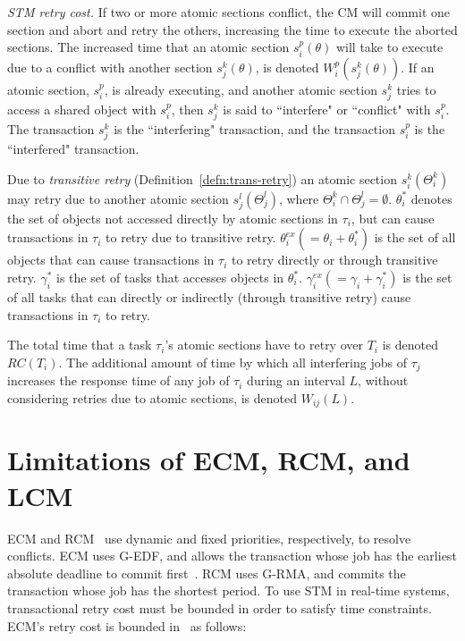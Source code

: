 \documentclass[twocolumn]{article}
\begin{document}
\textit{STM retry cost.} If two or more atomic sections conflict, the CM will commit one section and abort and retry the others, increasing the time to execute the aborted sections. The increased time that an atomic section $s_i^p (\theta)$ will take to execute due to a conflict with another section $s_j^k (\theta)$, is denoted $W_{i}^{p}(s_{j}^{k}(\theta))$. If an atomic section, $s_i^p$, is already executing, and another atomic section $s_j^k$ tries to access a shared object with $s_i^p$, then $s_j^k$ is said to ``interfere" or ``conflict" with $s_i^p$. The transaction $s_j^k$ is the ``interfering" transaction, and the transaction $s_i^p$ is the ``interfered" transaction.

Due to \textit{transitive retry} 
(Definition~\ref{defn:trans-retry}) 
an atomic section $s_i^k(\Theta_i^k)$ may retry due to another atomic section $s_j^l(\Theta_j^l)$, where $\Theta_i^k \cap \Theta_j^l = \emptyset$. $\theta_i^*$ denotes the set of objects not accessed directly by atomic sections in $\tau_i$, but can cause transactions in $\tau_i$ to retry due to transitive retry. $\theta_i^{ex}(=\theta_i + \theta_i^*)$ is the set of all objects that can cause transactions in $\tau_i$ to retry directly or through transitive retry. $\gamma_i^*$ is the set of tasks that accesses  objects in $\theta_i^*$. $\gamma_i^{ex}(=\gamma_i + \gamma_i^*)$ is the set of all tasks that can directly or indirectly (through transitive retry) cause transactions in $\tau_i$ to retry.

The total time that a task $\tau_i$'s atomic sections have to retry over $T_i$ is denoted $RC(T_i)$. The additional amount of time by which all interfering jobs of $\tau_j$ increases the response time of any job of $\tau_i$ during an interval $L$, without considering retries due to atomic sections, is denoted $W_{ij}(L)$.


\section{Limitations of ECM, RCM, and LCM}\label{probelm description}

ECM and RCM~\cite{stmconcurrencycontrol:emsoft11} use dynamic and fixed priorities, respectively, to resolve conflicts. ECM uses G-EDF, and allows the transaction whose job has the earliest absolute deadline to commit first~\cite{6045438}. RCM uses G-RMA, and commits the transaction whose job has the shortest period.
 To use STM in real-time systems, transactional retry cost must be bounded in order to satisfy time constraints.
  ECM's retry cost is bounded in~\cite{stmconcurrencycontrol:emsoft11} as follows:
\end{document}
